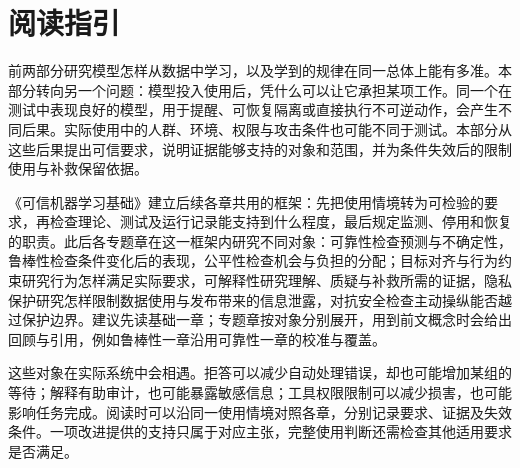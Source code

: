 \chapter*{阅读指引}

前两部分研究模型怎样从数据中学习，以及学到的规律在同一总体上能有多准。本部分转向另一个问题：模型投入使用后，凭什么可以让它承担某项工作。同一个在测试中表现良好的模型，用于提醒、可恢复隔离或直接执行不可逆动作，会产生不同后果。实际使用中的人群、环境、权限与攻击条件也可能不同于测试。本部分从这些后果提出可信要求，说明证据能够支持的对象和范围，并为条件失效后的限制使用与补救保留依据。

《可信机器学习基础》建立后续各章共用的框架：先把使用情境转为可检验的要求，再检查理论、测试及运行记录能支持到什么程度，最后规定监测、停用和恢复的职责。此后各专题章在这一框架内研究不同对象：可靠性检查预测与不确定性，鲁棒性检查条件变化后的表现，公平性检查机会与负担的分配；目标对齐与行为约束研究行为怎样满足实际要求，可解释性研究理解、质疑与补救所需的证据，隐私保护研究怎样限制数据使用与发布带来的信息泄露，对抗安全检查主动操纵能否越过保护边界。建议先读基础一章；专题章按对象分别展开，用到前文概念时会给出回顾与引用，例如鲁棒性一章沿用可靠性一章的校准与覆盖。

这些对象在实际系统中会相遇。拒答可以减少自动处理错误，却也可能增加某组的等待；解释有助审计，也可能暴露敏感信息；工具权限限制可以减少损害，也可能影响任务完成。阅读时可以沿同一使用情境对照各章，分别记录要求、证据及失效条件。一项改进提供的支持只属于对应主张，完整使用判断还需检查其他适用要求是否满足。
